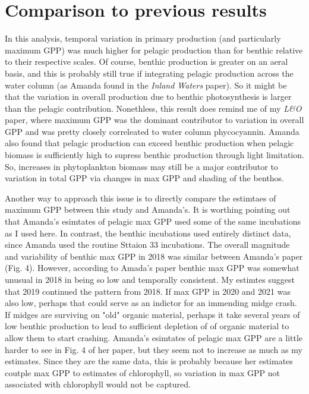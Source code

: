 \documentclass[12pt]{article}
\begin{document}
\section*{Comparison to previous results}

In this analysis, temporal variation in primary production (and particularly maximum GPP)
was much higher for pelagic production than for benthic relative to their respective scales.
Of course, benthic production is greater on an aeral basis, 
and this is probably still true if integrating pelagic production across the water column
(as Amanda found in the \textit{Inland Waters} paper).
So it might be that the variation in overall production due 
to benthic photosynthesis is larger than the pelagic contribution.
Nonethless, this result does remind me of my \textit{L\&O} paper,
where maximum GPP was the dominant contributor to variation in overall GPP
and was pretty closely correleated to water column phycocyannin.
Amanda also found that pelagic production can exceed benthic production 
when pelagic biomass is sufficiently high to supress benthic production 
through light limitation.
So, increases in phytoplankton biomass may still be a major contributor to 
variation in total GPP via changes in max GPP and shading of the benthos.

Another way to approach this issue is to directly compare the estimtaes of 
maximum GPP between this study and Amanda's.
It is worthing pointing out that Amanda's esimtates of pelagic max GPP
used some of the same incubations as I used here. 
In contrast, the benthic incubations used entirely distinct data,
since Amanda used the routine Sttaion 33 incubations.
The overall magnitude and variability of benthic max GPP in 2018
was similar between Amanda's paper (Fig. 4).
However, according to Amada's paper benthic max GPP was somewhat unusual in 2018 
in being so low and temporally consistent.
My estimtes suggest that 2019 continued the pattern from 2018.
If max GPP in 2020 and 2021 was also low, 
perhaps that could serve as an indictor for an immending midge crash. 
If midges are surviving on "old" organic material,
perhaps it take several years of low benthic production to 
lead to sufficient depletion of of organic material to allow them to start crashing.
Amanda's esimtates of pelagic max GPP are a little harder to see in Fig. 4 of her paper,
but they seem not to increase as much as my estimates. 
Since they are the same data, this is probably because her estimates 
coutple max GPP to estimates of chlorophyll, 
so variation in max GPP not associated with chlorophyll would not be captured.
\end{document}
